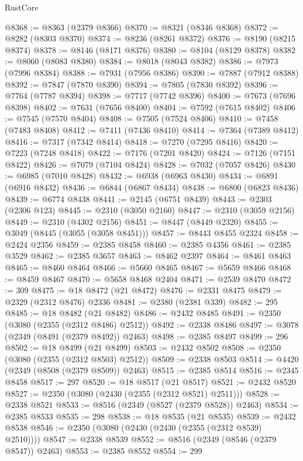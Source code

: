 \begin{lexlean}{RustCore}
\begin{coremodule}
@8368 := @8363 (@2379 @8366)
@8370 := @8321 (@8346 @8368)
@8372 := @8282 (@8303 @8370)
@8374 := @8236 (@8261 @8372)
@8376 := @8190 (@8215 @8374)
@8378 := @8146 (@8171 @8376)
@8380 := @8104 (@8129 @8378)
@8382 := @8060 (@8083 @8380)
@8384 := @8018 (@8043 @8382)
@8386 := @7973 (@7996 @8384)
@8388 := @7931 (@7956 @8386)
@8390 := @7887 (@7912 @8388)
@8392 := @7847 (@7870 @8390)
@8394 := @7805 (@7830 @8392)
@8396 := @7764 (@7787 @8394)
@8398 := @7717 (@7742 @8396)
@8400 := @7673 (@7696 @8398)
@8402 := @7631 (@7656 @8400)
@8404 := @7592 (@7615 @8402)
@8406 := @7545 (@7570 @8404)
@8408 := @7505 (@7524 @8406)
@8410 := @7458 (@7483 @8408)
@8412 := @7411 (@7436 @8410)
@8414 := @7364 (@7389 @8412)
@8416 := @7317 (@7342 @8414)
@8418 := @7270 (@7295 @8416)
@8420 := @7223 (@7248 @8418)
@8422 := @7176 (@7201 @8420)
@8424 := @7126 (@7151 @8422)
@8426 := @7079 (@7104 @8424)
@8428 := @7032 (@7057 @8426)
@8430 := @6985 (@7010 @8428)
@8432 := @6938 (@6963 @8430)
@8434 := @6891 (@6916 @8432)
@8436 := @6844 (@6867 @8434)
@8438 := @6800 (@6823 @8436)
@8439 := @6774 @8438
@8441 := @2145 (@6751 @8439)
@8443 := @2303 (@2306 @123)
@8445 := @2310 (@3050 @2160)
@8447 := @2310 (@3059 @2156)
@8449 := @2310 (@4302 @2156)
@8451 := @8447 (@8449 @2320)
@8455 := @3049 (@8445 (@3055 (@3058 @8451)))
@8457 := @8443 @8455 @2324
@8458 := @2424 @2356
@8459 := @2385 @8458
@8460 := @2385 @4356
@8461 := @2385 @3529
@8462 := @2385 @3657
@8463 := @8462 @2397
@8464 := @8461 @8463
@8465 := @8460 @8464
@8466 := @5660 @8465
@8467 := @5659 @8466
@8468 := @8459 @8467
@8470 := @5658 @8468 @2404
@8471 := @2539 @8470
@8472 := 309
@8475 := @18 @8472 (@21 @8472)
@8476 := @2331 @8475
@8479 := @2329 (@2312 @8476) @2336
@8481 := @2380 (@2381 @339)
@8482 := 295
@8485 := @18 @8482 (@21 @8482)
@8486 := @2432 @8485
@8491 := @2350 (@3080 (@2355 (@2312 @8486) @2512))
@8492 := @2338 @8486
@8497 := @3078 (@2349 (@8491 (@2379 @8492)) @2463)
@8498 := @2385 @8497
@8499 := 296
@8502 := @18 @8499 (@21 @8499)
@8503 := @2432 @8502
@8508 := @2350 (@3080 (@2355 (@2312 @8503) @2512))
@8509 := @2338 @8503
@8514 := @4420 (@2349 (@8508 (@2379 @8509)) @2463)
@8515 := @2385 @8514
@8516 := @2345 @8458
@8517 := 297
@8520 := @18 @8517 (@21 @8517)
@8521 := @2432 @8520
@8527 := @2350 (@3080 (@2430 (@2355 (@2312 @8521) @2511)))
@8528 := @2338 @8521
@8533 := @8516 (@2349 (@8527 (@2379 @8528)) @2463)
@8534 := @2385 @8533
@8535 := 298
@8538 := @18 @8535 (@21 @8535)
@8539 := @2432 @8538
@8546 := @2350 (@3080 (@2430 (@2430 (@2355 (@2312 @8539) @2510))))
@8547 := @2338 @8539
@8552 := @8516 (@2349 (@8546 (@2379 @8547)) @2463)
@8553 := @2385 @8552
@8554 := 299

\end{coremodule}
\end{lexlean}
